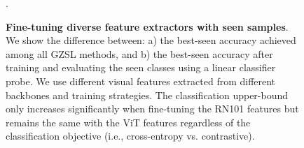 \begin{figure}[hbt!]
\centering
{}
\vspace{-0.25in}
\caption{\textbf{Fine-tuning diverse feature extractors with seen samples}. We show the difference between: a) the best-seen accuracy achieved among all GZSL methods, and b) the best-seen accuracy after training and evaluating the seen classes using a linear classifier probe. We use different visual features extracted from different backbones and training strategies. The classification upper-bound only increases significantly when fine-tuning the RN101\cite{RNs} features but remains the same with the ViT\cite{ViT} features regardless of the classification objective (i.e., cross-entropy vs. contrastive). }.
\label{fig:seen_acc_difference}
\vspace{-0.1in}
\end{figure}


